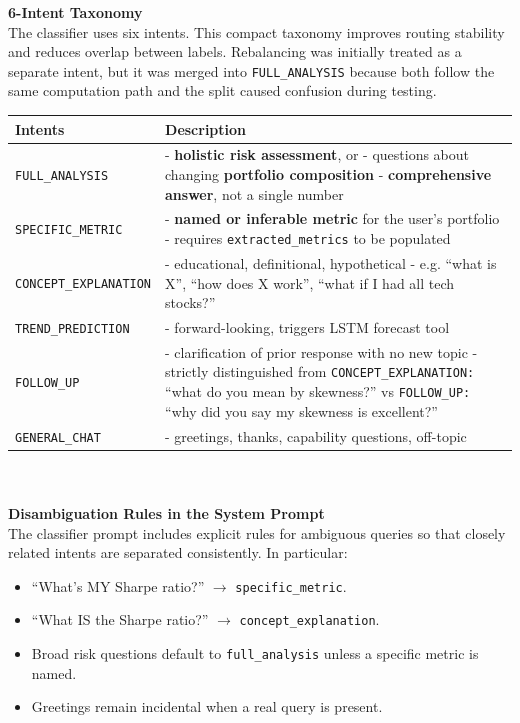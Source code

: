 \textbf{6-Intent Taxonomy}\\
The classifier uses six intents. This compact taxonomy improves routing stability and reduces overlap between labels. Rebalancing was initially treated as a separate intent, but it was merged into \texttt{FULL\_ANALYSIS} because both follow the same computation path and the split caused confusion during testing.\\

\begin{tabular}{|l|p{9.6cm}|}
\hline
Intents & Description \\
\hline

\texttt{FULL\_ANALYSIS} &
- \textbf{holistic risk assessment}, or \newline
- questions about changing \textbf{portfolio composition} \newline
- \textbf{comprehensive answer}, not a single number\\
\hline

\texttt{SPECIFIC\_METRIC} &
- \textbf{named or inferable metric} for the user's portfolio \newline
- requires \texttt{extracted\_metrics} to be populated\\
\hline

\texttt{CONCEPT\_EXPLANATION} &
- educational, definitional, hypothetical \newline
- e.g. “what is X”, “how does X work”, “what if I had all tech stocks?”\\
\hline

\texttt{TREND\_PREDICTION} &
- forward-looking, triggers LSTM forecast tool\\
\hline

\texttt{FOLLOW\_UP} &
- clarification of prior response with no new topic \newline
- strictly distinguished from \texttt{CONCEPT\_EXPLANATION:} “what do you mean by skewness?” vs \texttt{FOLLOW\_UP:} “why did you say my skewness is excellent?”\\
\hline

\texttt{GENERAL\_CHAT} &
- greetings, thanks, capability questions, off-topic\\
\hline

\end{tabular}\\\\

\textbf{Disambiguation Rules in the System Prompt}\\
The classifier prompt includes explicit rules for ambiguous queries so that closely related intents are separated consistently. In particular:
\begin{itemize}
    \item ``What's MY Sharpe ratio?'' $\rightarrow$ \texttt{specific\_metric}.
    \item ``What IS the Sharpe ratio?'' $\rightarrow$ \texttt{concept\_explanation}.
    \item Broad risk questions default to \texttt{full\_analysis} unless a specific metric is named.
    \item Greetings remain incidental when a real query is present.
\end{itemize}

